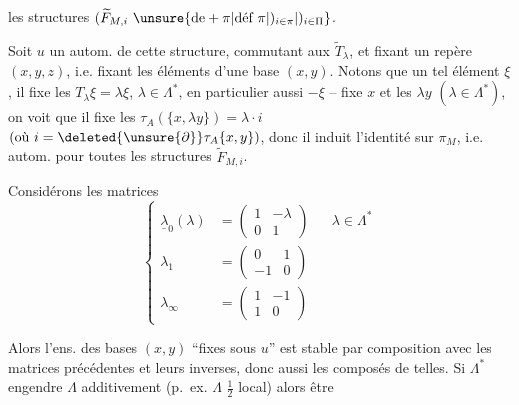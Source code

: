 les structures $(\widetilde F_{M,i}\ \unsure{\text{de}\mathbin{+}\pi|\text{déf}\ \pi|)_{i\in\pi}|)_{i\in\Pi}}$.

Soit $u$ un autom. de cette structure,
commutant aux  $\widetilde T_\lambda$, et fixant un
repère $(x,y,z)$, i.e. fixant les éléments
d'une base $(x,y)$.
  Notons que un
tel élément $\xi$,  il fixe les $T_\lambda\xi=\lambda\xi$, $\lambda\in\Lambda^*$,
en particulier aussi $-\xi$ -- 
 
 fixe $x$ et les $\lambda y$ $(\lambda\in\Lambda^*)$, on voit que il
 fixe les $\tau_A(\{x,\lambda y\})=\lambda\cdot i$
$(\text{où}\ i=\deleted{\unsure{\partial}}\tau_A\{x,y\})$, donc
il induit l'identité sur $\pi_M$, i.e.  
autom. pour toutes les structures $\widetilde F_{M,i}$.

 Considérons les matrices
\[
\left\{\begin{aligned}
\underline{\lambda}_0(\lambda)&=\begin{pmatrix}1&-\lambda\\0&1\end{pmatrix}
&&\lambda\in\Lambda^*\\
\lambda_1&=\begin{pmatrix}0&1\\-1&0\end{pmatrix}\\
\lambda_\infty&=\begin{pmatrix}1&-1\\1&0\end{pmatrix}
\end{aligned}\right.
\]

Alors l'ens. des bases $(x,y)$ ``fixes sous $u$'' est stable par composition avec les matrices
précédentes et leurs inverses, donc aussi
les composés de telles. Si $\Lambda^*$ engendre $\Lambda$
additivement (p.~ex. $\Lambda$ $\frac12$ local) alors  être
